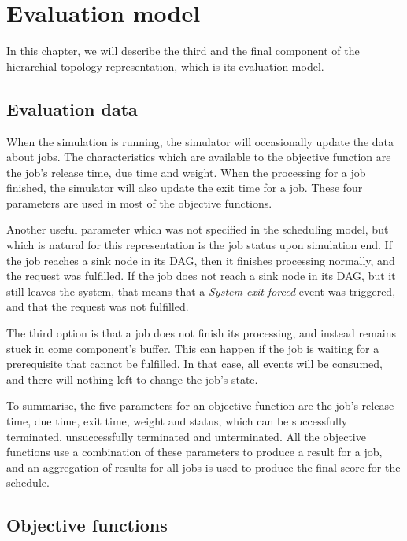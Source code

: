 \chapter{Evaluation model}
\label{sec:evaluation_model}

In this chapter, we will describe the third and the final component of the hierarchial topology representation, which is its evaluation model.

\section{Evaluation data}
\label{sec:evaluation_data}
When the simulation is running, the simulator will occasionally update the data about jobs. The characteristics which are available to the objective function are the job's release time, due time and weight. When the processing for a job finished, the simulator will also update the exit time for a job. These four parameters are used in most of the objective functions.

Another useful parameter which was not specified in the scheduling model, but which is natural for this representation is the job status upon simulation end. If the job reaches a sink node in its DAG, then it finishes processing normally, and the request was fulfilled. If the job does not reach a sink node in its DAG, but it still leaves the system, that means that a \textit{System exit forced} event was triggered, and that the request was not fulfilled. 

The third option is that a job does not finish its processing, and instead remains stuck in come component's buffer. This can happen if the job is waiting for a prerequisite that cannot be fulfilled. In that case, all events will be consumed, and there will nothing left to change the job's state.

To summarise, the five parameters for an objective function are the job's release time, due time, exit time, weight and status, which can be successfully terminated, unsuccessfully terminated and unterminated. All the objective functions use a combination of these parameters to produce a result for a job, and an aggregation of results for all jobs is used to produce the final score for the schedule.

\section{Objective functions}
\label{sec:objective_functions}

